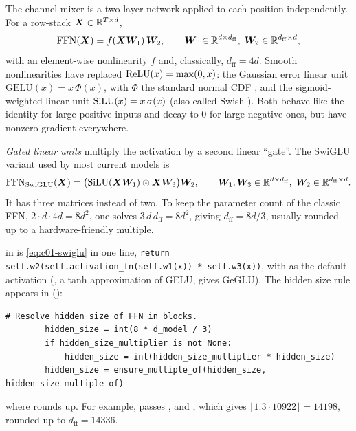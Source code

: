 The channel mixer is a two-layer network applied to each position independently. For a
row-stack $\bm{X} \in \mathbb{R}^{T\times d}$,
\begin{equation}\label{eq:c01-ffn}
  \mathrm{FFN}(\bm{X}) = f(\bm{X}\bm{W}_1)\,\bm{W}_2,\qquad \bm{W}_1 \in \mathbb{R}^{d\times d_{\mathrm{ff}}},\;
  \bm{W}_2 \in \mathbb{R}^{d_{\mathrm{ff}}\times d},
\end{equation}
with an element-wise nonlinearity $f$ and, classically, $d_{\mathrm{ff}} = 4d$. Smooth
nonlinearities have replaced $\operatorname{ReLU}(x) = \max(0, x)$: the Gaussian error linear unit
$\mathrm{GELU}(x) = x\,\Phi(x)$, with $\Phi$ the standard normal CDF
\citep{c01-hendrycks2016gelu}, and the sigmoid-weighted linear unit
$\operatorname{SiLU}(x) = x\,\sigma(x)$ (also called Swish \citep{c01-ramachandran2017swish}). Both
behave like the identity for large positive inputs and decay to $0$ for large negative
ones, but have nonzero gradient everywhere.

\emph{Gated linear units} \citep{c01-dauphin2017glu} multiply the activation by a second
linear ``gate''. The SwiGLU variant \citep{c01-shazeer2020glu} used by most current models is
\begin{equation}\label{eq:c01-swiglu}
  \mathrm{FFN}_{\mathrm{SwiGLU}}(\bm{X}) = \bigl(\operatorname{SiLU}(\bm{X}\bm{W}_1) \odot \bm{X}\bm{W}_3\bigr)\bm{W}_2,
  \qquad \bm{W}_1, \bm{W}_3 \in \mathbb{R}^{d\times d_{\mathrm{ff}}},\; \bm{W}_2 \in \mathbb{R}^{d_{\mathrm{ff}}\times d}.
\end{equation}
It has three matrices instead of two. To keep the parameter count of the classic FFN,
$2 \cdot d \cdot 4d = 8d^2$, one solves $3\,d\,d_{\mathrm{ff}} = 8d^2$, giving
$d_{\mathrm{ff}} = 8d/3$, usually rounded up to a hardware-friendly multiple.

\begin{implnote}[title={In the code: SwiGLU in OLMo-core}]
 in 
is \eqref{eq:c01-swiglu} in one line, \texttt{return self.w2(self.activation\_fn(self.w1(x)) *
self.w3(x))}, with  as the default activation (, a tanh
approximation of GELU, gives GeGLU). The hidden size rule appears in
():
\begin{lstlisting}[caption={Excerpt from \texttt{repos/\allowbreak allenai\_\_OLMo-core/\allowbreak src/\allowbreak olmo\_core/\allowbreak nn/\allowbreak transformer/\allowbreak config.py}},label={lst:c01-olmo-hidden}]
        # Resolve hidden size of FFN in blocks.
        hidden_size = int(8 * d_model / 3)
        if hidden_size_multiplier is not None:
            hidden_size = int(hidden_size_multiplier * hidden_size)
        hidden_size = ensure_multiple_of(hidden_size, hidden_size_multiple_of)
\end{lstlisting}
where  rounds up. For example,  passes
,  and ,
which gives $\lfloor 1.3\cdot 10922\rfloor = 14198$, rounded up to $d_{\mathrm{ff}} = 14336$.
\end{implnote}

